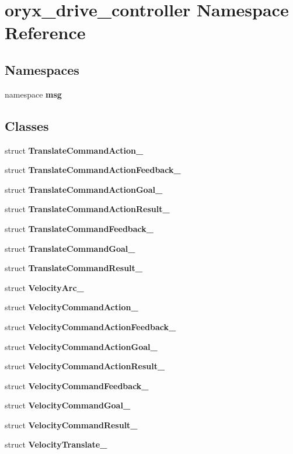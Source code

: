 \section{oryx\-\_\-drive\-\_\-controller \-Namespace \-Reference}
\label{namespaceoryx__drive__controller}
\subsection*{\-Namespaces}
\begin{DoxyCompactItemize}
\item 
namespace {\bf msg}
\end{DoxyCompactItemize}
\subsection*{\-Classes}
\begin{DoxyCompactItemize}
\item 
struct {\bf \-Translate\-Command\-Action\-\_\-}
\item 
struct {\bf \-Translate\-Command\-Action\-Feedback\-\_\-}
\item 
struct {\bf \-Translate\-Command\-Action\-Goal\-\_\-}
\item 
struct {\bf \-Translate\-Command\-Action\-Result\-\_\-}
\item 
struct {\bf \-Translate\-Command\-Feedback\-\_\-}
\item 
struct {\bf \-Translate\-Command\-Goal\-\_\-}
\item 
struct {\bf \-Translate\-Command\-Result\-\_\-}
\item 
struct {\bf \-Velocity\-Arc\-\_\-}
\item 
struct {\bf \-Velocity\-Command\-Action\-\_\-}
\item 
struct {\bf \-Velocity\-Command\-Action\-Feedback\-\_\-}
\item 
struct {\bf \-Velocity\-Command\-Action\-Goal\-\_\-}
\item 
struct {\bf \-Velocity\-Command\-Action\-Result\-\_\-}
\item 
struct {\bf \-Velocity\-Command\-Feedback\-\_\-}
\item 
struct {\bf \-Velocity\-Command\-Goal\-\_\-}
\item 
struct {\bf \-Velocity\-Command\-Result\-\_\-}
\item 
struct {\bf \-Velocity\-Translate\-\_\-}
\end{DoxyCompactItemize}
